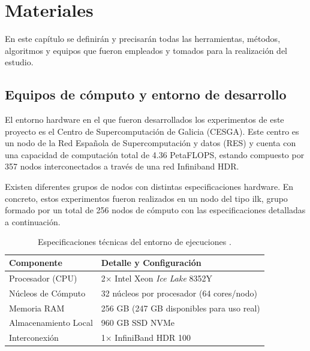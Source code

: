 \chapter{Materiales}

En este capítulo se definirán y precisarán todas las herramientas, métodos, algoritmos y equipos que fueron empleados y tomados para la realización del estudio.

\section{Equipos de cómputo y entorno de desarrollo}
El entorno hardware en el que fueron desarrollados los experimentos de este proyecto es el Centro de Supercomputación de Galicia (CESGA). Este centro es un nodo de la Red Española de Supercomputación y datos (RES) y cuenta con una capacidad de computación total de 4.36 PetaFLOPS, estando compuesto por 357 nodos interconectados a través de una red Infiniband HDR.

Existen diferentes grupos de nodos con distintas especificaciones hardware. En concreto, estos experimentos fueron realizados en un nodo del tipo ilk, grupo formado por un total de 256 nodos de cómputo con las especificaciones detalladas a continuación.
\begin{table}[htbp]
\centering
\caption{Especificaciones técnicas del entorno de ejecuciones \cite{cesga_ft3_guide}.}
\label{tab:especificaciones_cesga}
\begin{tabular}{ll}
\toprule
\textbf{Componente} & \textbf{Detalle y Configuración} \\
\midrule
Procesador (CPU)    & 2$\times$ Intel Xeon \textit{Ice Lake} 8352Y \\
Núcleos de Cómputo  & 32 núcleos por procesador (64 cores/nodo) \\
Memoria RAM         & 256 GB (247 GB disponibles para uso real) \\
Almacenamiento Local& 960 GB SSD NVMe \\
Interconexión       & 1$\times$ InfiniBand HDR 100 \\
\bottomrule
\end{tabular}
\end{table}


